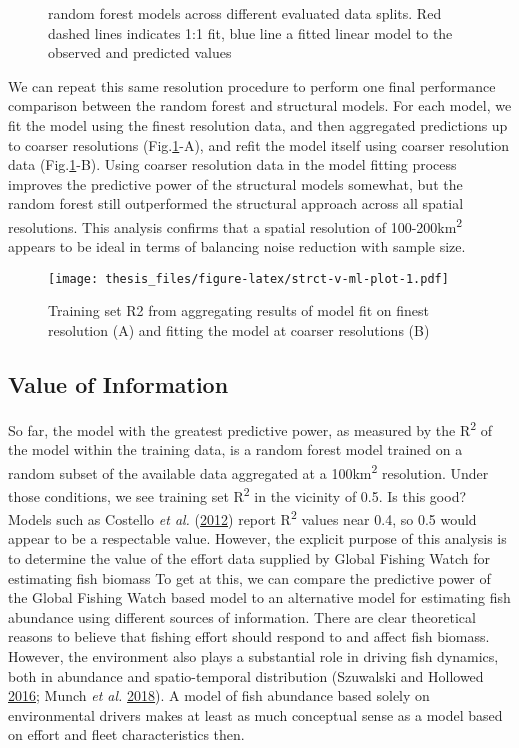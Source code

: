 \documentclass[twoside,12pt,final]{ucthesis-CA2012}
\begin{document}
\begin{ucmainmatter}
\begin{figure}
{random forest models across different evaluated data splits. Red dashed
lines indicates 1:1 fit, blue line a fitted linear model to the observed
and predicted values}
\end{figure}
We can repeat this same resolution procedure to perform one final
performance comparison between the random forest and structural models.
For each model, we fit the model using the finest resolution data, and
then aggregated predictions up to coarser resolutions
(Fig.\ref{fig:strct-v-ml-plot}-A), and refit the model itself using
coarser resolution data (Fig.\ref{fig:strct-v-ml-plot}-B). Using coarser
resolution data in the model fitting process improves the predictive
power of the structural models somewhat, but the random forest still
outperformed the structural approach across all spatial resolutions.
This analysis confirms that a spatial resolution of
100-200km\textsuperscript{2} appears to be ideal in terms of balancing
noise reduction with sample size.
\begin{figure}
\centering
\texttt{[image: thesis\_files/figure-latex/strct-v-ml-plot-1.pdf]}
\caption{\label{fig:strct-v-ml-plot}Training set R2 from aggregating results
of model fit on finest resolution (A) and fitting the model at coarser
resolutions (B)}
\end{figure}
\subsection{Value of Information}\label{value-of-information}

So far, the model with the greatest predictive power, as measured by the
R\textsuperscript{2} of the model within the training data, is a random
forest model trained on a random subset of the available data aggregated
at a 100km\textsuperscript{2} resolution. Under those conditions, we see
training set R\textsuperscript{2} in the vicinity of 0.5. Is this good?
Models such as Costello \emph{et al.}
(\protect\hyperlink{ref-Costello2012a}{2012}) report
R\textsuperscript{2} values near 0.4, so 0.5 would appear to be a
respectable value. However, the explicit purpose of this analysis is to
determine the value of the effort data supplied by Global Fishing Watch
for estimating fish biomass To get at this, we can compare the
predictive power of the Global Fishing Watch based model to an
alternative model for estimating fish abundance using different sources
of information. There are clear theoretical reasons to believe that
fishing effort should respond to and affect fish biomass. However, the
environment also plays a substantial role in driving fish dynamics, both
in abundance and spatio-temporal distribution (Szuwalski and Hollowed
\protect\hyperlink{ref-Szuwalski2016}{2016}; Munch \emph{et al.}
\protect\hyperlink{ref-Munch2018}{2018}). A model of fish abundance
based solely on environmental drivers makes at least as much conceptual
sense as a model based on effort and fleet characteristics then.


\end{ucmainmatter}
\end{document}
